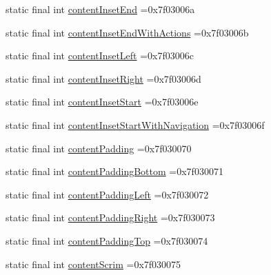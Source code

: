 \begin{DoxyCompactItemize}
static final int \mbox{\hyperlink{classbr_1_1unb_1_1cic_1_1mp_1_1marketmaster_1_1test_1_1R_1_1attr_aa6271ea75247528107fde08e5847d237}{content\+Inset\+End}} =0x7f03006a
\item 
static final int \mbox{\hyperlink{classbr_1_1unb_1_1cic_1_1mp_1_1marketmaster_1_1test_1_1R_1_1attr_a56d9c80c25e823919850527bcc8c15b1}{content\+Inset\+End\+With\+Actions}} =0x7f03006b
\item 
static final int \mbox{\hyperlink{classbr_1_1unb_1_1cic_1_1mp_1_1marketmaster_1_1test_1_1R_1_1attr_adb01a79e2657d2da655e30d4bf5c30c9}{content\+Inset\+Left}} =0x7f03006c
\item 
static final int \mbox{\hyperlink{classbr_1_1unb_1_1cic_1_1mp_1_1marketmaster_1_1test_1_1R_1_1attr_a47582d59b271a8f7296d57147e65c5ed}{content\+Inset\+Right}} =0x7f03006d
\item 
static final int \mbox{\hyperlink{classbr_1_1unb_1_1cic_1_1mp_1_1marketmaster_1_1test_1_1R_1_1attr_af4e9a4af4b13bd41ea3386aee8b12d34}{content\+Inset\+Start}} =0x7f03006e
\item 
static final int \mbox{\hyperlink{classbr_1_1unb_1_1cic_1_1mp_1_1marketmaster_1_1test_1_1R_1_1attr_a0fd5e8227c6d43b7dadb5c99c9ecbea9}{content\+Inset\+Start\+With\+Navigation}} =0x7f03006f
\item 
static final int \mbox{\hyperlink{classbr_1_1unb_1_1cic_1_1mp_1_1marketmaster_1_1test_1_1R_1_1attr_a959dbf57999ba5a5bccdf10c61d7cd12}{content\+Padding}} =0x7f030070
\item 
static final int \mbox{\hyperlink{classbr_1_1unb_1_1cic_1_1mp_1_1marketmaster_1_1test_1_1R_1_1attr_a046620320a5dffd664d94148ee637383}{content\+Padding\+Bottom}} =0x7f030071
\item 
static final int \mbox{\hyperlink{classbr_1_1unb_1_1cic_1_1mp_1_1marketmaster_1_1test_1_1R_1_1attr_a9963d4ee4e03de8a2788fd23e540002c}{content\+Padding\+Left}} =0x7f030072
\item 
static final int \mbox{\hyperlink{classbr_1_1unb_1_1cic_1_1mp_1_1marketmaster_1_1test_1_1R_1_1attr_a6f85e5b981a74596affd369d1390a64f}{content\+Padding\+Right}} =0x7f030073
\item 
static final int \mbox{\hyperlink{classbr_1_1unb_1_1cic_1_1mp_1_1marketmaster_1_1test_1_1R_1_1attr_a38c5bd89639818bc0cccaf9fd1af6653}{content\+Padding\+Top}} =0x7f030074
\item 
static final int \mbox{\hyperlink{classbr_1_1unb_1_1cic_1_1mp_1_1marketmaster_1_1test_1_1R_1_1attr_ae2de6f7df0ddbc7b6d49e7db5cddb5a9}{content\+Scrim}} =0x7f030075
\item 

\end{DoxyCompactItemize}
